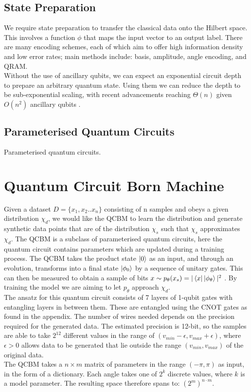 \documentclass[12pt]{article}
\numberwithin{equation}{section}
\begin{document}
\subsection{State Preparation}
We require state preparation to transfer the classical data onto the 
Hilbert space. This involves a function $\phi$ that maps the input vector to 
an output label. There are many encoding schemes, each of which aim to offer 
high information density and low error rates; main methods include: basis, amplitude, angle encoding, and QRAM. 
\\
Without the use of ancillary qubits, we can expect an exponential circuit depth
to prepare an arbitrary quantum state. Using them we can reduce the depth to be 
sub-exponential scaling, with recent advancements reaching $\Theta(n)$ given $O(n^2)$
ancillary qubits
\cite{shaib_efficient_2023,zhang_quantum_2022}.



\subsection{Parameterised Quantum Circuits}
Parameterised quantum circuits.

\clearpage
\section{Quantum Circuit Born Machine}
Given a dataset $D = \{x_1, x_2.. x_n\}$ consisting of n samples and obeys a 
given distribution $\chi_d$, we would like the QCBM to learn the distribution 
and generate synthetic data points that are of the distribution $\chi_s$ such that
$\chi_s$ approximates $\chi_d$.
The QCBM is a subclass of parameterised quantum circuits, 
here the quantum circuit contains parameters which are updated during a training 
process. The QCBM takes the product state $\ket{0}$ as an input, and through an 
evolution, transforms into a final state $\ket{\phi_0}$ by a sequence of unitary 
gates. This can then be measured to obtain a sample of bits 
$x \sim p_\theta (x_s)=|\bra{x}\ket{\phi_\theta}|^2$ . By training the model we 
are aiming to let $p_\theta$ approach $\chi_d$. 
\\
The ansatz for this quantum circuit consists of 7 layers
of 1-qubit gates with entangling layers in between them. These are 
entangled using the CNOT gates as found in the appendix. The number of wires 
needed depends on the precision required for the generated data. The estimated
precision is 12-bit, so the samples are able to take $2^{12}$ different values in 
the range of $ (v_{min} - \epsilon, v_{max} + \epsilon )$, where $\epsilon > 0 $
allows data to be generated that lie outside the range $(v_{min},v_{max})$ of the 
original data.
\\
The QCBM takes a $n \times m$ matrix of parameters in the range $(-\pi, \pi)$ as 
input, in the form of a dictionary. Each angle takes one of $2^k$ discrete values, 
where $k$ is a model parameter. The resulting space therefore spans to: 
$(2^m)^{n\cdot m}$.
\end{document}
